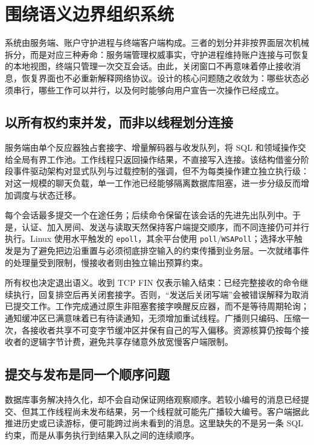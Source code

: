 \section{围绕语义边界组织系统}
\label{sec:design}

系统由服务端、账户守护进程与终端客户端构成。三者的划分并非按界面层次机械拆分，而是对应三种寿命：服务端管理权威事实，守护进程维持账户连接与可恢复的本地视图，终端只管理一次交互会话。由此，关闭窗口不再意味着停止接收消息，恢复界面也不必重新解释网络协议。设计的核心问题随之收敛为：哪些状态必须串行，哪些工作可以并行，以及何时能够向用户宣告一次操作已经成立。

\subsection{以所有权约束并发，而非以线程划分连接}

服务端由单个反应器独占套接字、增量解码器与收发队列，将 SQL 和领域操作交给全局有界工作池。工作线程只返回操作结果，不直接写入连接。该结构借鉴分阶段事件驱动架构对显式队列与过载控制的强调\cite{seda}，但不为每类操作建立独立执行级：对这一规模的聊天负载，单一工作池已经能够隔离数据库阻塞，进一步分级反而增加调度与状态迁移。

每个会话最多提交一个在途任务；后续命令保留在该会话的先进先出队列中。于是，认证、加入房间、发送与读取天然保持客户端提交顺序，而不同连接仍可并行执行。Linux 使用水平触发的 \texttt{epoll}，其余平台使用 \texttt{poll}/\texttt{WSAPoll}；选择水平触发是为了避免把边沿重置与必须彻底排空输入的约束传播到业务层\cite{epoll}。一次就绪事件的处理量受到限制，慢接收者则由独立输出预算约束。

所有权也决定退出语义。收到 TCP FIN 仅表示输入结束：已经完整接收的命令继续执行，回复排空后再关闭套接字。否则，“发送后关闭写端”会被错误解释为取消已提交工作。工作完成通过原生非阻塞套接字唤醒反应器，而不是等待周期轮询；通知缓冲区已满意味着已有待读通知，无须增加重试线程。广播则只编码、压缩一次，各接收者共享不可变字节缓冲区并保有自己的写入偏移。资源核算仍按每个接收者的逻辑字节计费，避免共享存储意外放宽慢客户端限制。

\subsection{提交与发布是同一个顺序问题}

数据库事务解决持久化，却不会自动保证网络观察顺序。若较小编号的消息已经提交、但其工作线程尚未发布结果，另一个线程就可能先广播较大编号。客户端据此推进历史或已读游标，便可能跨过尚未看到的消息。这里缺失的不是另一条 SQL 约束，而是从事务执行到结果入队之间的连续顺序。

